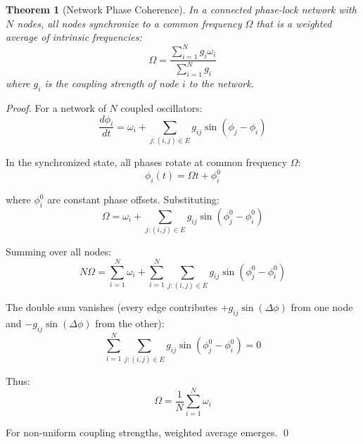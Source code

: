 \documentclass[11pt]{article}
\newtheorem{theorem}{Theorem}[section]
\theoremstyle{remark}
\begin{document}
\begin{theorem}[Network Phase Coherence]
\label{thm:network_coherence}
In a connected phase-lock network with $N$ nodes, all nodes synchronize to a common frequency $\Omega$ that is a weighted average of intrinsic frequencies:
\begin{equation}
\Omega = \frac{\sum_{i=1}^{N} g_i \omega_i}{\sum_{i=1}^{N} g_i}
\end{equation}
where $g_i$ is the coupling strength of node $i$ to the network.
\end{theorem}

\begin{proof}
For a network of $N$ coupled oscillators:
\begin{equation}
\frac{d\phi_i}{dt} = \omega_i + \sum_{j:(i,j) \in E} g_{ij} \sin(\phi_j - \phi_i)
\end{equation}

In the synchronized state, all phases rotate at common frequency $\Omega$:
\begin{equation}
\phi_i(t) = \Omega t + \phi_i^0
\end{equation}

where $\phi_i^0$ are constant phase offsets. Substituting:
\begin{equation}
\Omega = \omega_i + \sum_{j:(i,j) \in E} g_{ij} \sin(\phi_j^0 - \phi_i^0)
\end{equation}

Summing over all nodes:
\begin{equation}
N \Omega = \sum_{i=1}^{N} \omega_i + \sum_{i=1}^{N} \sum_{j:(i,j) \in E} g_{ij} \sin(\phi_j^0 - \phi_i^0)
\end{equation}

The double sum vanishes (every edge contributes $+g_{ij} \sin(\Delta\phi)$ from one node and $-g_{ij} \sin(\Delta\phi)$ from the other):
\begin{equation}
\sum_{i=1}^{N} \sum_{j:(i,j) \in E} g_{ij} \sin(\phi_j^0 - \phi_i^0) = 0
\end{equation}

Thus:
\begin{equation}
\Omega = \frac{1}{N} \sum_{i=1}^{N} \omega_i
\end{equation}

For non-uniform coupling strengths, weighted average emerges. \qed
\end{proof}
\end{document}
